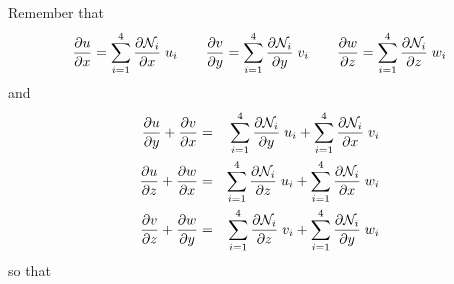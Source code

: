 Remember that
\[
\frac{\partial u}{\partial x} = \sum_{i=1}^4 \frac{\partial {\mathcal{N}}_i}{\partial x}\;  u_i 
\quad\quad
\frac{\partial v}{\partial y} = \sum_{i=1}^4 \frac{\partial {\mathcal{N}}_i}{\partial y}\;  v_i 
\quad\quad
\frac{\partial w}{\partial z} = \sum_{i=1}^4 \frac{\partial {\mathcal{N}}_i}{\partial z}\;  w_i 
\]
and 
\begin{eqnarray}
\frac{\partial u}{\partial y} +\frac{\partial v}{\partial x} 
&=& \sum_{i=1}^4 \frac{\partial {\mathcal{N}}_i}{\partial y}\;  u_i
+ \sum_{i=1}^4 \frac{\partial {\mathcal{N}}_i}{\partial x}\;  v_i \nonumber\\
\frac{\partial u}{\partial z} +\frac{\partial w}{\partial x} 
&=& \sum_{i=1}^4 \frac{\partial {\mathcal{N}}_i}{\partial z}\;  u_i
+ \sum_{i=1}^4 \frac{\partial {\mathcal{N}}_i}{\partial x}\;  w_i \nonumber\\
\frac{\partial v}{\partial z} +\frac{\partial w}{\partial y} 
&=& \sum_{i=1}^4 \frac{\partial {\mathcal{N}}_i}{\partial z}\;  v_i
+ \sum_{i=1}^4 \frac{\partial {\mathcal{N}}_i}{\partial y}\;  w_i \nonumber
\end{eqnarray}
so that
